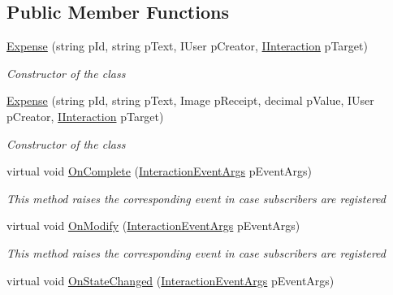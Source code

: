\subsection*{Public Member Functions}
\begin{DoxyCompactItemize}
\item 
\hyperlink{class_plex_byte_1_1_mo_cap_1_1_interactions_1_1_expense_a2a71f640711b211319c26cf08f86255e}{Expense} (string p\+Id, string p\+Text, I\+User p\+Creator, \hyperlink{interface_plex_byte_1_1_mo_cap_1_1_interactions_1_1_i_interaction}{I\+Interaction} p\+Target)
\begin{DoxyCompactList}\small\item\em Constructor of the class \end{DoxyCompactList}\item 
\hyperlink{class_plex_byte_1_1_mo_cap_1_1_interactions_1_1_expense_a9bb0e412ed6e63676930d4da916e79d6}{Expense} (string p\+Id, string p\+Text, Image p\+Receipt, decimal p\+Value, I\+User p\+Creator, \hyperlink{interface_plex_byte_1_1_mo_cap_1_1_interactions_1_1_i_interaction}{I\+Interaction} p\+Target)
\begin{DoxyCompactList}\small\item\em Constructor of the class \end{DoxyCompactList}\item 
virtual void \hyperlink{class_plex_byte_1_1_mo_cap_1_1_interactions_1_1_expense_a81535f3b98deeaab3e03d190543a4127}{On\+Complete} (\hyperlink{class_plex_byte_1_1_mo_cap_1_1_interactions_1_1_interaction_event_args}{Interaction\+Event\+Args} p\+Event\+Args)
\begin{DoxyCompactList}\small\item\em This method raises the corresponding event in case subscribers are registered \end{DoxyCompactList}\item 
virtual void \hyperlink{class_plex_byte_1_1_mo_cap_1_1_interactions_1_1_expense_a224578edb2ee395588eebd15fcfc29a3}{On\+Modify} (\hyperlink{class_plex_byte_1_1_mo_cap_1_1_interactions_1_1_interaction_event_args}{Interaction\+Event\+Args} p\+Event\+Args)
\begin{DoxyCompactList}\small\item\em This method raises the corresponding event in case subscribers are registered \end{DoxyCompactList}\item 
virtual void \hyperlink{class_plex_byte_1_1_mo_cap_1_1_interactions_1_1_expense_abe824865e6ea9cc7b3d2644e6e0e4069}{On\+State\+Changed} (\hyperlink{class_plex_byte_1_1_mo_cap_1_1_interactions_1_1_interaction_event_args}{Interaction\+Event\+Args} p\+Event\+Args)

\end{DoxyCompactItemize}
